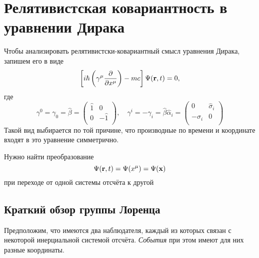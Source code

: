 \section{Релятивистская ковариантность в уравнении Дирака}

Чтобы анализировать релятивистски-ковариантный смысл уравнения Дирака, запишем его в виде
$$
   \left[ i \hbar \left( \gamma^\mu \ud{}{x^{\mu}}\right) - mc \right] \Psi(\bf r, t) = 0,
$$
где
$$
    \gamma^0 = \gamma_0 = \hat \beta =  \begin{pmatrix}
                 \hat 1 & 0 \\
                 0 & -\hat 1 \\
               \end{pmatrix}, \quad 
    \gamma^i = - \gamma_i = \hat \beta \hat \alpha_i = 
    \begin{pmatrix}
      0 & \hat \sigma_i \\
      -\hat \sigma_i & 0 \\
    \end{pmatrix}
$$
Такой вид выбирается по той причине, что производные по времени и координате входят в это уравнение симметрично.

Нужно найти преобразование
$$
    \Psi(\bf r, t) = \Psi(x^\mu) = \Psi(\bf x)
$$
при переходе от одной системы отсчёта к другой

\subsection{Краткий обзор группы Лоренца}
Предположим, что имеются два наблюдателя, каждый из которых связан с некоторой инерциальной системой отсчёта. \emph{События} при этом имеют для них разные координаты.

